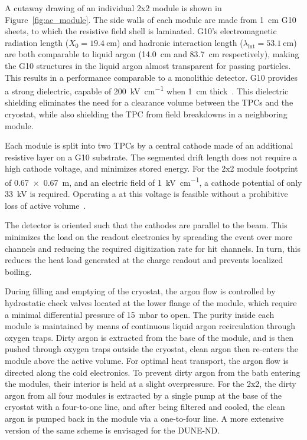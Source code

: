 A cutaway drawing of an individual 2x2 module is shown in Figure~\ref{fig:ac_module}. The side walls of each module are made from \SI{1}{\centi\metre} G10 sheets, to which the resistive field shell is laminated. G10's electromagnetic radiation length ($X_{\mathrm{0}} = \SI{19.4}{\centi\metre}$) and hadronic interaction length ($\lambda_{\mathrm{int}} = \SI{53.1}{\centi\metre}$)~\cite{Yao:2006px} are both comparable to liquid argon (14.0~cm and 83.7~cm respectively), making the G10 structures in the liquid argon almost transparent for passing particles. This results in a performance comparable to a monolithic detector. G10 provides a strong dielectric, capable of \SI{200}{\kilo\volt\per\centi\metre} when \SI{1}{\centi\metre} thick~\cite{G10Breakdown}. This dielectric shielding eliminates the need for a clearance volume between the TPCs and the cryostat, while also shielding the TPC from field breakdowns in a neighboring module. 

Each module is split into two TPCs by a central cathode made of an additional resistive layer on a G10 substrate. The segmented drift length does not require a high cathode voltage, and minimizes stored energy. For the 2x2 module footprint of \SI{0.67 x 0.67}{\metre}, and an electric field of \SI{1}{\kilo\volt\per\centi\metre}, a cathode potential of only \SI{33}{\kilo\volt} is required. Operating a  at this voltage is feasible without a prohibitive loss of active volume~\cite{Zeller:2013sva}.

The detector is oriented such that the cathodes are parallel to the beam. This minimizes the load on the readout electronics by spreading the event over more channels and reducing the required digitization rate for hit channels. In turn, this reduces the heat load generated at the charge readout and prevents localized boiling.

During filling and emptying of the cryostat, the argon flow is controlled by hydrostatic check valves located at the lower flange of the module, which require a minimal differential pressure of \SI{15}{\milli\bar} to open. The purity inside each module is maintained by means of continuous liquid argon recirculation through oxygen traps. Dirty argon is extracted from the base of the module, and is then pushed through oxygen traps outside the cryostat, clean argon then re-enters the module above the active volume. For optimal heat transport, the argon flow is directed along the cold electronics. To prevent dirty argon from the bath entering the modules, their interior is held at a slight overpressure. For the 2x2, the dirty argon from all four modules is extracted by a single pump at the base of the cryostat with a four-to-one line, and after being filtered and cooled, the clean argon is pumped back in the module via a one-to-four line.
A more extensive version of the same scheme is envisaged for the DUNE-ND.  


